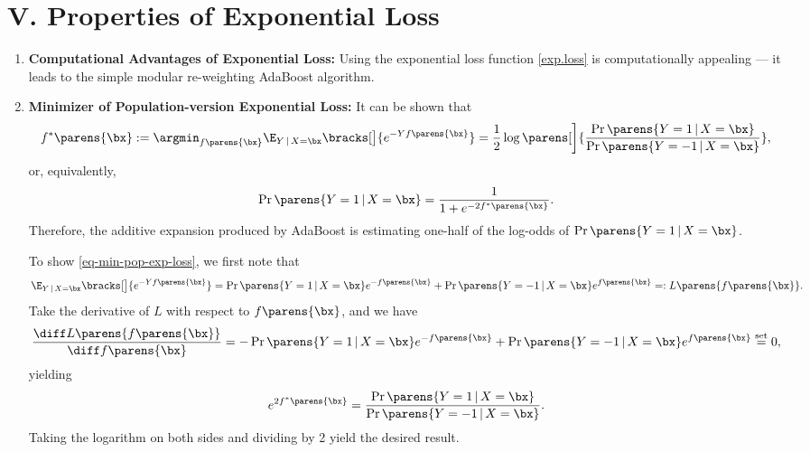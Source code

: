 \documentclass[12pt]{article}
\begin{document}
\section*{V. Properties of Exponential Loss}
	
\begin{enumerate}[label=\textbf{\arabic*.}]
	
	\item \textbf{Computational Advantages of Exponential Loss:} Using the exponential loss function \eqref{exp.loss} is computationally appealing --- it leads to the simple modular re-weighting AdaBoost algorithm. 
	
	\item \textbf{Minimizer of Population-version Exponential Loss:} It can be shown that 
	\begin{align}\label{eq-min-pop-exp-loss}
		f^* \parens{\bx} := \argmin_{f \parens{\bx}} \E_{Y \,\vert\, X = \bx} \bracks[\big]{e^{-Y f\parens{\bx}}} = \frac{1}{2} \log \parens[\bigg]{\frac{\Pr \parens{Y = 1 \,\vert\, X = \bx}}{\Pr\parens{Y = -1 \,\vert\, X = \bx}}}, 
	\end{align}
	or, equivalently, 
	\begin{align*}
		\Pr \parens{Y = 1 \,\vert\, X = \bx} = \frac{1}{1 + e^{-2f^* \parens{\bx}}}. 
	\end{align*}
	Therefore, the additive expansion produced by AdaBoost is estimating one-half of the log-odds of $\Pr\parens{Y = 1 \,\vert\, X = \bx}$. 
	
	To show \eqref{eq-min-pop-exp-loss}, we first note that 
	\begin{align*}
		\E_{Y \,\vert\, X = \bx} \bracks[\big]{e^{-Y f \parens{\bx}}} = \Pr \parens{Y = 1 \,\vert\, X = \bx} e^{-f \parens{\bx}} + \Pr \parens{Y = -1 \,\vert\, X = \bx} e^{f \parens{\bx}} =: L \parens{f \parens{\bx}}. 
	\end{align*}
	Take the derivative of $L$ with respect to $f \parens{\bx}$, and we have 
	\begin{align*}
		\frac{\diff L \parens{f \parens{\bx}}}{\diff f \parens{\bx}} = - \Pr \parens{Y = 1 \,\vert\, X = \bx} e^{-f \parens{\bx}} + \Pr \parens{Y = -1 \,\vert\, X = \bx} e^{f \parens{\bx}} \stackrel{\text{set}}{=} 0, 
	\end{align*}
	yielding 
	\begin{align*}
		e^{2f^* \parens{\bx}} = \frac{\Pr \parens{Y = 1 \,\vert\, X = \bx}}{\Pr \parens{Y = -1 \,\vert\, X = \bx}}. 
	\end{align*}
	Taking the logarithm on both sides and dividing by 2 yield the desired result. 
	

\end{enumerate}
\end{document}
